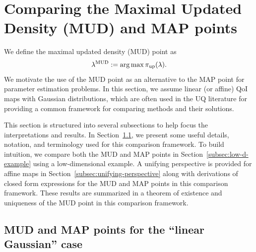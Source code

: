 \section{Comparing the Maximal Updated Density (MUD) and MAP points}\label{sec:estimation}

We define the maximal updated density (MUD) point as
\begin{equation}\label{eq:mudpt_inital_defn}
	\lambda^{\text{MUD}} := \operatorname*{arg\,max} {\operatorname*{\pi_{up}}}(\lambda).
\end{equation}
We motivate the use of the MUD point as an alternative to the MAP point for parameter estimation problems.
In this section, we assume linear (or affine) QoI maps with Gaussian distributions, which are often used in the UQ literature for providing a common framework for comparing methods and their solutions.

This section is structured into several subsections to help focus the interpretations and results.
In Section~\ref{subsec:Motivation}, we present some useful details, notation, and terminology used for this comparison framework.
To build intuition, we compare both the MUD and MAP points in Section~\ref{subsec:low-d-example} using a low-dimensional example.
A unifying perspective is provided for affine maps in Section~\ref{subsec:unifying-perspective} along with derivations of closed form expressions for the MUD and MAP points in this comparison framework.
These results are summarized in a theorem of existence and uniqueness of the MUD point in this comparison framework.


\subsection{MUD and MAP points for the ``linear Gaussian'' case}\label{subsec:Motivation}

